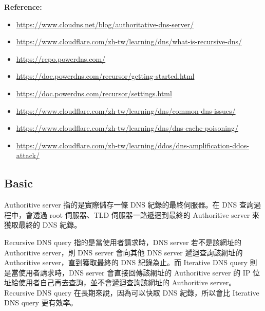 \documentclass[12pt]{article}
\newenvironment{problem}[2][Problem]{\begin{trivlist}
\item[\hskip \labelsep {\bfseries #1}\hskip \labelsep {\bfseries #2}]}{\end{trivlist}}
\newenvironment{mycolorbox}[1][gray]{
  \renewmdenv[
    linewidth=2pt, linecolor=#1, backgroundcolor=#1!10,
    topline=false, bottomline=false, rightline=false,
    skipabove=10pt, skipbelow=10pt, innerleftmargin=10pt,
    innerrightmargin=0pt, innertopmargin=5pt, innerbottommargin=5pt
  ]{myquote}
  \begin{myquote}
}{\end{myquote}}
\begin{document}
\begin{mycolorbox}[teal]
  \textbf{Reference:}
  \footnotesize
  \begin{itemize}
    \item \url{https://www.cloudns.net/blog/authoritative-dns-server/}
    \item \url{https://www.cloudflare.com/zh-tw/learning/dns/what-is-recursive-dns/}
    \item \url{https://repo.powerdns.com/}
    \item \url{https://doc.powerdns.com/recursor/getting-started.html}
    \item \url{https://doc.powerdns.com/recursor/settings.html}
    \item \url{https://www.cloudflare.com/zh-tw/learning/dns/common-dns-issues/}
    \item \url{https://www.cloudflare.com/zh-tw/learning/dns/dns-cache-poisoning/}
    \item \url{https://www.cloudflare.com/zh-tw/learning/ddos/dns-amplification-ddos-attack/}
  \end{itemize}
\end{mycolorbox}

\setcounter{subsection}{-1}
\subsection{Basic}
\begin{problem}{2.0.1}
  Authoritive server 指的是實際儲存一條 DNS 紀錄的最終伺服器。在 DNS 查詢過程中，會透過 root 伺服器、TLD 伺服器一路遞迴到最終的 Authoritive server 來獲取最終的 DNS 紀錄。
\end{problem}

\begin{problem}{2.0.2}
  Recursive DNS query 指的是當使用者請求時，DNS server 若不是該網址的 Authoritive server，則 DNS server 會向其他 DNS server 遞迴查詢該網址的 Authoritive server，直到獲取最終的 DNS 紀錄為止。而 Iterative DNS query 則是當使用者請求時，DNS server 會直接回傳該網址的 Authoritive server 的 IP 位址給使用者自己再去查詢，並不會遞迴查詢該網址的 Authoritive server。 Recursive DNS query 在長期來說，因為可以快取 DNS 紀錄，所以會比 Iterative DNS query 更有效率。
\end{problem}
\end{document}
